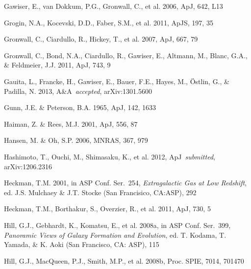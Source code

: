 \documentclass{emulateapj}
\def\apj{ApJ}
\def\apjs{ApJS}
\def\asp{ASP Conf. Ser.}
\def\mnras{MNRAS}
\def\aap{A\&A}
\def\spie{Proc. SPIE}
\begin{document}
\begin{thebibliography}{}
 Gawiser, E., van Dokkum, P.G., Gronwall, C., et al. 2006, \apj, 642, L13

 Grogin, N.A., Kocevski, D.D., Faber, S.M., et al. 2011, \apjs, 197, 35

 Gronwall, C., Ciardullo, R., Hickey, T., et al. 2007, \apj, 667, 79

 Gronwall, C., Bond, N.A., Ciardullo, R., Gawiser, E., Altmann, M., Blanc, G.A., \& Feldmeier, J.J. 2011, \apj, 743, 9

 Gauita, L., Francke, H., Gawiser, E., Bauer, F.E., Hayes, M., \"{O}stlin, G., \& Padilla, N. 2013, \aap\ \textit{accepted}, arXiv:1301.5600

 Gunn, J.E. \& Peterson, B.A. 1965, \apj, 142, 1633

 Haiman, Z. \& Rees, M.J. 2001, \apj, 556, 87

 Hansen, M. \& Oh, S.P. 2006, \mnras, 367, 979

 Hashimoto, T., Ouchi, M., Shimasaku, K., et al. 2012, \apj\ \textit{submitted}, arXiv:1206.2316

 Heckman, T.M. 2001, in \asp\ 254, \textit{Extragalactic Gas at Low Redshift}, ed. J.S. Mulchaey \& J.T. Stocke (San Francisico, CA:ASP), 292

 Heckman, T.M., Borthakur, S., Overzier, R., et al. 2011, \apj, 730, 5

 Hill, G.J., Gebhardt, K., Komatsu, E., et al. 2008a, in \asp\ 399, \textit{Panoramic Views of Galaxy Formation and Evolution}, ed. T. Kodama, T. Yamada, \& K. Aoki (San Francisco, CA: ASP), 115

 Hill, G.J., MacQueen, P.J., Smith, M.P., et al. 2008b, \spie, 7014, 701470


\end{thebibliography}
\end{document}
